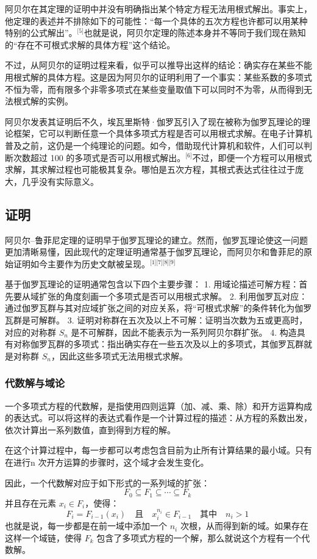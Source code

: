 阿贝尔在其定理的证明中并没有明确指出某个特定方程无法用根式解出。事实上，他定理的表述并不排除如下的可能性：“每一个具体的五次方程也许都可以用某种特别的公式解出”。\(^\text{[5]}\)也就是说，阿贝尔定理的陈述本身并不等同于我们现在熟知的“存在不可根式求解的具体方程”这个结论。

不过，从阿贝尔的证明过程来看，似乎可以推导出这样的结论：确实存在某些不能用根式解的具体方程。这是因为阿贝尔的证明利用了一个事实：某些系数的多项式不恒为零，而有限多个非零多项式在某些变量取值下可以同时不为零，从而得到无法根式解的实例。

阿贝尔发表其证明后不久，埃瓦里斯特·伽罗瓦引入了现在被称为伽罗瓦理论的理论框架，它可以判断任意一个具体多项式方程是否可以用根式求解。在电子计算机普及之前，这仍是一个纯理论的问题。如今，借助现代计算机和软件，人们可以判断次数超过 100 的多项式是否可以用根式解出。\(^\text{[6]}\)不过，即便一个方程可以用根式求解，其求解过程也可能极其复杂。哪怕是五次方程，其根式表达式往往过于庞大，几乎没有实际意义。
\subsection{证明}
阿贝尔–鲁菲尼定理的证明早于伽罗瓦理论的建立。然而，伽罗瓦理论使这一问题更加清晰易懂，因此现代的定理证明通常基于伽罗瓦理论，而阿贝尔和鲁菲尼的原始证明如今主要作为历史文献被呈现。\(^\text{[1][7][8][9]}\)

基于伽罗瓦理论的证明通常包含以下四个主要步骤：
1. 用域论描述可解方程：首先要从域扩张的角度刻画一个多项式是否可以用根式求解。
2. 利用伽罗瓦对应：通过伽罗瓦群与其对应域扩张之间的对应关系，将“可根式求解”的条件转化为伽罗瓦群是可解群。
3. 证明对称群在五次及以上不可解：证明当次数为五或更高时，对应的对称群 $S_n$ 是不可解群，因此不能表示为一系列阿贝尔群扩张。
4. 构造具有对称伽罗瓦群的多项式：指出确实存在一些五次及以上的多项式，其伽罗瓦群就是对称群 $S_n$，因此这些多项式无法用根式求解。
\subsubsection{代数解与域论}
一个多项式方程的代数解，是指使用四则运算（加、减、乘、除）和开方运算构成的表达式。可以将这样的表达式看作是一个计算过程的描述：从方程的系数出发，依次计算出一系列数值，直到得到方程的解。

在这个计算过程中，每一步都可以考虑包含目前为止所有计算结果的最小域。只有在进行n 次开方运算的步骤时，这个域才会发生变化。

因此，一个代数解对应于如下形式的一系列域的扩张：
$$
F_0 \subseteq F_1 \subseteq \cdots \subseteq F_k~
$$
并且存在元素 $x_i \in F_i$，使得：
$$
F_i = F_{i-1}(x_i) \quad \text{且} \quad x_i^{n_i} \in F_{i-1} \quad \text{其中} \quad n_i > 1~
$$
也就是说，每一步都是在前一域中添加一个 $n_i$ 次根，从而得到新的域。如果存在这样一个域链，使得 $F_k$ 包含了多项式方程的一个解，那么就说这个方程有一个代数解。

